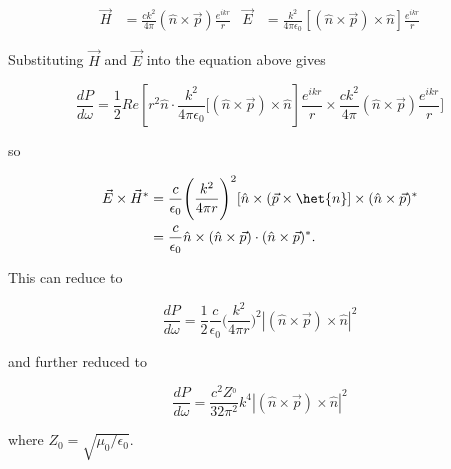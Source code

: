 \documentclass[11pt]{article}
\begin{document}
\begin{align*}
    \vec{H} &= \frac{ck^{2}}{4\pi}(\hat{n} \times \vec{p}) \frac{e^{ikr}}{r} &
    \vec{E} &= \frac{k^{2}}{4\pi \epsilon_{0}} [(\hat{n} \times \vec{p}) \times \hat{n}] \frac{e^{ikr}}{r}
\end{align*}

Substituting $\vec{H}$ and $\vec{E}$ into the equation above gives 

$$
\frac{dP}{d \omega} = \frac{1}{2} Re[r^{2}\hat{n} \cdot \frac{k^{2}}{4\pi \epsilon_{0}} \Bigg[(\hat{n} \times \vec{p}) \times \hat{n}] \frac{e^{ikr}}{r} \times \frac{ck^{2}}{4\pi}(\hat{n} \times \vec{p}) \frac{e^{ikr}}{r}\Bigg]
$$

so

\begin{align*}
    \vec{E} \times \vec{H}^{*} &= \frac{c}{\epsilon_{0}} \Bigg(\frac{k^{2}}{4\pi r}\Bigg)^{2} [\hat{n} \times (\vec{p} \times \het{n}] \times (\hat{n} \times \vec{p})^{*} \\
    &= \frac{c}{\epsilon_{0}} \hat{n} \times (\hat{n} \times \vec{p}) \cdot (\hat{n} \times \vec{p})^{*}.
\end{align*}

This can reduce to 

$$
\frac{dP}{d \omega} = \frac{1}{2} \frac{c}{\epsilon_{0}} \Bigg(\frac{k^{2}}{4\pi r}\Bigg)^{2} | (\hat{n} \times \vec{p}) \times \hat{n}|^{2}
$$

and further reduced to 

$$
\frac{dP}{d \omega} = \frac{c^{2} Z^_{0}}{32\pi^{2}} k^{4} |(\hat{n} \times \vec{p}) \times \hat{n}|^{2}
$$

where $Z_{0} = \sqrt{\mu_{0}/\epsilon_{0}}$.

\clearpage


%

\clearpage


\end{document}

